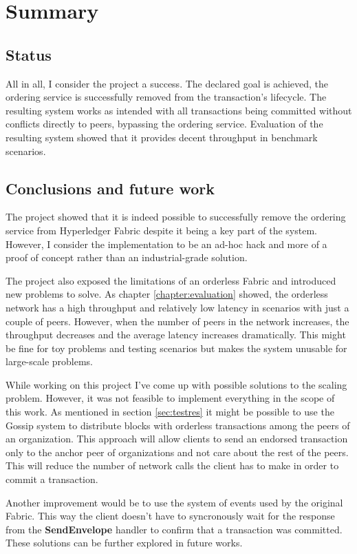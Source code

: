 \chapter{Summary} \label{chapter:summary}

\section{Status}
\label{sec:status}

All in all, I consider the project a success. The declared goal is achieved, the ordering service is successfully removed from the transaction's lifecycle. The resulting system works as intended with all transactions being committed without conflicts directly to peers, bypassing the ordering service. Evaluation of the resulting system showed that it provides decent throughput in benchmark scenarios.

\section{Conclusions and future work}
\label{sec:conclusions}

The project showed that it is indeed possible to successfully remove the ordering service from Hyperledger Fabric despite it being a key part of the system. However, I consider the implementation to be an ad-hoc hack and more of a proof of concept rather than an industrial-grade solution.

The project also exposed the limitations of an orderless Fabric and introduced new problems to solve. As chapter \ref{chapter:evaluation} showed, the orderless network has a high throughput and relatively low latency in scenarios with just a couple of peers. However, when the number of peers in the network increases, the throughput decreases and the average latency increases dramatically.  This might be fine for toy problems and testing scenarios but makes the system unusable for large-scale problems.

While working on this project I've come up with possible solutions to the scaling problem. However, it was not feasible to implement everything in the scope of this work. As mentioned in section \ref{sec:testres} it might be possible to use the Gossip system to distribute blocks with orderless transactions among the peers of an organization. This approach will allow clients to send an endorsed transaction only to the anchor peer of organizations and not care about the rest of the peers. This will reduce the number of network calls the client has to make in order to commit a transaction.

Another improvement would be to use the system of events used by the original Fabric. This way the client doesn't have to syncronously wait for the response from the \textbf{SendEnvelope} handler to confirm that a transaction was committed. These solutions can be further explored in future works.
